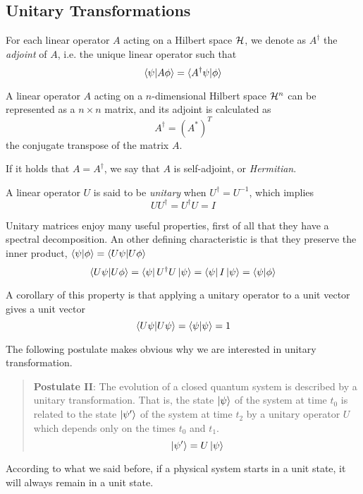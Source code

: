 \subsection{Unitary Transformations}

For each linear operator $A$ acting on a Hilbert space $\mathcal{H}$, we denote as $A^\dagger$ the \textit{adjoint} of $A$, i.e. the unique linear operator such that
\[
	\braket{\psi|A\phi} = \braket{A^\dagger\psi|\phi}
\]

A linear operator $A$ acting on a $n$-dimensional Hilbert space $\mathcal{H}^n$ can be represented as a $n\times n$ matrix, and its adjoint is calculated as 
\[
	A^\dagger = (A^*)^T
\] the conjugate transpose of the matrix $A$.


If it holds that $A = A^\dagger$, we say that $A$ is self-adjoint, or \textit{Hermitian}.

A linear operator $U$ is said to be \textit{unitary} when $U^\dagger = U^{-1}$, which implies 
\[
	UU^\dagger = U^\dagger U = I
\]

Unitary matrices enjoy many useful properties, first of all that they have a spectral decomposition. An other defining characteristic is that they preserve the inner product, $\braket{\psi | \phi} = \braket{U\psi | U\phi}$
\[
	\braket{U\psi | U\phi} = \bra{\psi}U^\dagger U\ket{\psi} = \bra{\psi}I\ket{\psi} = \braket{\psi|\phi}
\]

A corollary of this property is that applying a unitary operator to a unit vector gives a unit vector
\[
	\braket{U\psi | U\psi} = \braket{\psi|\psi} = 1
\]

The following postulate makes obvious why we are interested in unitary transformation.
\begin{quote}
\textbf{Postulate II}: The evolution of a closed quantum system is described by a unitary transformation. That is, the state $\ket{\psi}$ of the system at time $t_0$ is related to the state $\ket{\psi^\prime}$ of the system at time $t_2$ by a unitary operator $U$ which depends only on the times $t_0$ and $t_1$.
\[
	\ket{\psi^\prime} = U\ket{\psi}
\]
\end{quote}

According to what we said before, if a physical system starts in a unit state, it will always remain in a unit state.

